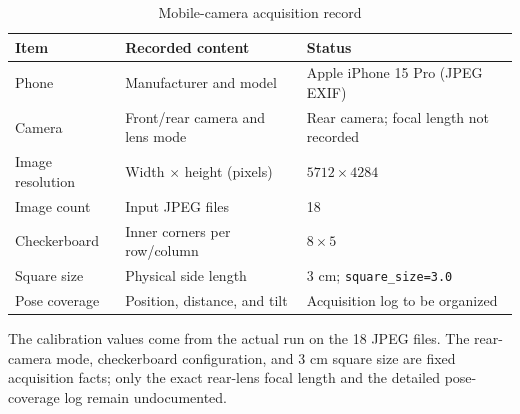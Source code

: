 \begin{table}[htbp]
    \centering
    \caption{Mobile-camera acquisition record}
    \label{tab:task2-data-record}
    \begin{tabular}{lll}
        \hline
        Item & Recorded content & Status \\
        \hline
        Phone & Manufacturer and model & Apple iPhone 15 Pro (JPEG EXIF) \\
        Camera & Front/rear camera and lens mode & Rear camera; focal length not recorded \\
        Image resolution & Width \(\times\) height (pixels) & \(5712\times4284\) \\
        Image count & Input JPEG files & 18 \\
        Checkerboard & Inner corners per row/column & \(8\times5\) \\
        Square size & Physical side length & 3 cm; \texttt{square\_size=3.0} \\
        Pose coverage & Position, distance, and tilt & Acquisition log to be organized \\
        \hline
    \end{tabular}
\end{table}

The calibration values come from the actual run on the 18 JPEG files. The rear-camera mode, checkerboard configuration, and 3 cm square size are fixed acquisition facts; only the exact rear-lens focal length and the detailed pose-coverage log remain undocumented.
